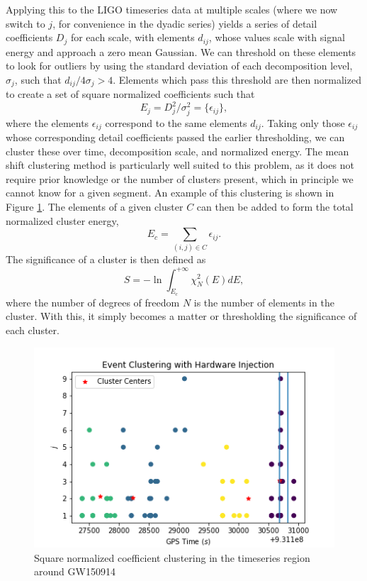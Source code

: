 \documentclass{article}
\begin{document}
Applying this to the LIGO timeseries data at multiple scales (where we now switch to $j$, for convenience in the dyadic series) yields a series of detail coefficients $D_{j}$ for each scale, with elements $d_{ij}$, whose values scale with signal energy and approach a zero mean Gaussian\citep{Blackburn2007}. We can threshold on these elements to look for outliers by using the standard deviation of each decomposition level, $\sigma_{j}$, such that $d_{ij}/4\sigma_{j} > 4$. Elements which pass this threshold are then normalized to create a set of square normalized coefficients such that
\begin{equation}
E_{j} = D_{j}^{2}/\sigma_{j}^{2} = \{\epsilon_{ij}\},
\end{equation}
where the elements $\epsilon_{ij}$ correspond to the same elements $d_{ij}$. Taking only those $\epsilon_{ij}$ whose corresponding detail coefficients passed the earlier thresholding, we can cluster these over time, decomposition scale, and normalized energy. The mean shift clustering method is particularly well suited to this problem, as it does not require prior knowledge or the number of clusters present\citep{Ivezic2014}, which in principle we cannot know for a given segment. An example of this clustering is shown in Figure \ref{fig:cluster}. The elements of a given cluster $C$ can then be added to form the total normalized cluster energy\citep{Blackburn2007},
\begin{equation}
E_{c} = \sum_{(i,j)\in C}\epsilon_{ij}. \label{eq:Ec}
\end{equation}
The significance of a cluster is then defined as\citep{Blackburn2007}
\begin{equation}
S=-\ln\int_{E_{c}}^{+\infty}\chi_{N}^{2}(E)dE, \label{eq:significance}
\end{equation}
where the number of degrees of freedom $N$ is the number of elements in the cluster. With this, it simply becomes a matter or thresholding the significance of each cluster.

\begin{figure}
\includegraphics[width=\textwidth]{cluster.png}
\caption{Square normalized coefficient clustering in the timeseries region around GW150914}
\label{fig:cluster}
\end{figure}
\end{document}
